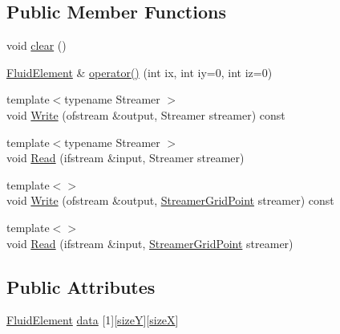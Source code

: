 \subsection*{Public Member Functions}
\begin{DoxyCompactItemize}
\item 
void \hyperlink{struct_fluid_block_af2c2703f49640b00d0757ab6d22bdec9}{clear} ()
\item 
\hyperlink{struct_fluid_element}{Fluid\+Element} \& \hyperlink{struct_fluid_block_a0cc6dc89e9a9a3b9c1b61eda26a041eb}{operator()} (int ix, int iy=0, int iz=0)
\item 
{\footnotesize template$<$typename Streamer $>$ }\\void \hyperlink{struct_fluid_block_a1737418d1510f3ac1ab6750c9738568d}{Write} (ofstream \&output, Streamer streamer) const 
\item 
{\footnotesize template$<$typename Streamer $>$ }\\void \hyperlink{struct_fluid_block_a903987108c4851693bc498a736010aff}{Read} (ifstream \&input, Streamer streamer)
\item 
{\footnotesize template$<$$>$ }\\void \hyperlink{struct_fluid_block_a30bcb9d7e2f10a1e27c3eb2898c02981}{Write} (ofstream \&output, \hyperlink{struct_streamer_grid_point}{Streamer\+Grid\+Point} streamer) const 
\item 
{\footnotesize template$<$$>$ }\\void \hyperlink{struct_fluid_block_ab68e1e1b161ea573e9b8adda1538ae0c}{Read} (ifstream \&input, \hyperlink{struct_streamer_grid_point}{Streamer\+Grid\+Point} streamer)
\end{DoxyCompactItemize}
\subsection*{Public Attributes}
\begin{DoxyCompactItemize}
\item 
\hyperlink{struct_fluid_element}{Fluid\+Element} \hyperlink{struct_fluid_block_adaf63688f4901ef6640e3ee02aeabf42}{data} \mbox{[}1\mbox{]}\mbox{[}\hyperlink{struct_fluid_block_afd21ed464f6732be798bba7d87113bd2}{size\+Y}\mbox{]}\mbox{[}\hyperlink{struct_fluid_block_a4894f513519efdad2837a01cfb65f42e}{size\+X}\mbox{]}
\end{DoxyCompactItemize}
